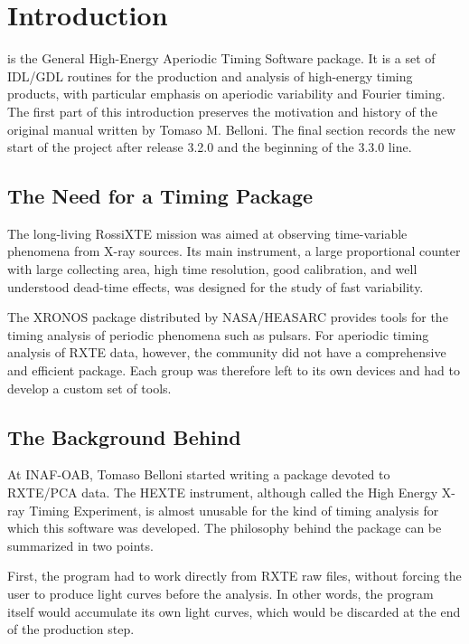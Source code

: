 \chapter{Introduction}

\ghats{} is the General High-Energy Aperiodic Timing Software package.  It is a
set of IDL/GDL routines for the production and analysis of high-energy timing
products, with particular emphasis on aperiodic variability and Fourier timing.
The first part of this introduction preserves the motivation and history of the
original manual written by Tomaso M. Belloni.  The final section records the new
start of the project after release 3.2.0 and the beginning of the 3.3.0 line.

\section{The Need for a Timing Package}

The long-living RossiXTE mission was aimed at observing time-variable phenomena
from X-ray sources.  Its main instrument, a large proportional counter with large
collecting area, high time resolution, good calibration, and well understood
dead-time effects, was designed for the study of fast variability.

The XRONOS package distributed by NASA/HEASARC provides tools for the timing
analysis of periodic phenomena such as pulsars.  For aperiodic timing analysis
of RXTE data, however, the community did not have a comprehensive and efficient
package.  Each group was therefore left to its own devices and had to develop a
custom set of tools.

\section{The Background Behind \ghats}

At INAF-OAB, Tomaso Belloni started writing a package devoted to RXTE/PCA data.
The HEXTE instrument, although called the High Energy X-ray Timing Experiment,
is almost unusable for the kind of timing analysis for which this software was
developed.  The philosophy behind the package can be summarized in two points.

First, the program had to work directly from RXTE raw files, without forcing the
user to produce light curves before the analysis.  In other words, the program
itself would accumulate its own light curves, which would be discarded at the
end of the production step.

